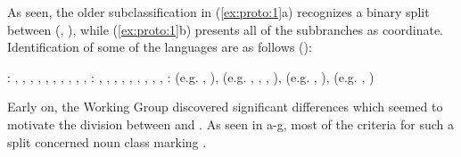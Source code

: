 \documentclass[output=paper]{langsci/langscibook}
\begin{document}




As seen, the older subclassification in (\ref{ex:proto:1}a) recognizes a binary split between  (, ), while (\ref{ex:proto:1}b) presents all of the subbranches as coordinate. Identification of some of the languages are as follows (\citealt{HymanVoorhoeve1980,Watters2003}):

\ea%
    \label{ex:proto:2}
    \ea {}:  , , , , , , , , , , 
    \ex  {}:  , , , , , , , , , 
    \ex  {}:   (e.g. , ),  (e.g. , , , ),  (e.g. , ),  (e.g. , )
    \z
\z

Early on, the  Working Group discovered significant differences which seemed to motivate the division between  and . As seen in a-g, most of the criteria for such a split concerned noun class marking \citep[55]{Stallcup1980geo}.
\end{document}
